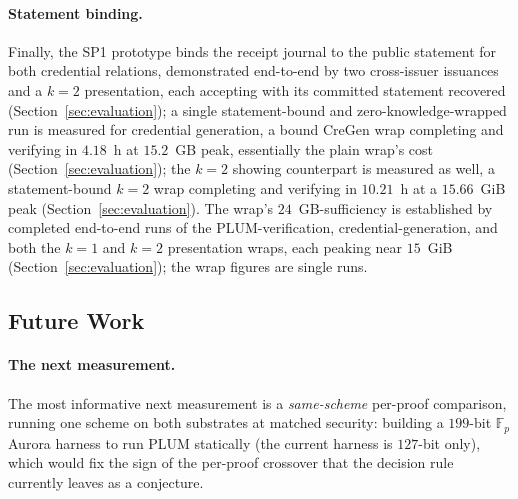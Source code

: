 \paragraph{Statement binding.}
Finally, the SP1 prototype binds the receipt journal to the public statement for both credential relations, demonstrated end-to-end by two cross-issuer issuances and a $k=2$ presentation, each accepting with its committed statement recovered (Section~\ref{sec:evaluation}); a single statement-bound and zero-knowledge-wrapped run is measured for credential generation, a bound CreGen wrap completing and verifying in $4.18$~h at $15.2$~GB peak, essentially the plain wrap's cost (Section~\ref{sec:evaluation}); the $k=2$ showing counterpart is measured as well, a statement-bound $k=2$ wrap completing and verifying in $10.21$~h at a $15.66$~GiB peak (Section~\ref{sec:evaluation}). The wrap's $24$~GB-sufficiency is established by completed end-to-end runs of the PLUM-verification, credential-generation, and both the $k=1$ and $k=2$ presentation wraps, each peaking near $15$~GiB (Section~\ref{sec:evaluation}); the wrap figures are single runs.
\subsection{Future Work}\label{subsec:conclusion-future}

\paragraph{The next measurement.}
The most informative next measurement is a \emph{same-scheme} per-proof comparison, running one scheme on both substrates at matched security: building a $199$-bit $\mathbb{F}_p$ Aurora harness to run PLUM statically (the current harness is $127$-bit only), which would fix the sign of the per-proof crossover that the decision rule currently leaves as a conjecture.

